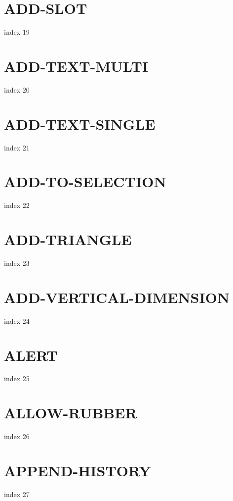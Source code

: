 \documentclass[10pt]{report}
\begin{document}
\section{ADD-SLOT}

index 19

\section{ADD-TEXT-MULTI}

index 20

\section{ADD-TEXT-SINGLE}

index 21

\section{ADD-TO-SELECTION}

index 22

\section{ADD-TRIANGLE}

index 23

\section{ADD-VERTICAL-DIMENSION}

index 24

\section{ALERT}

index 25

\section{ALLOW-RUBBER}

index 26

\section{APPEND-HISTORY}

index 27
\end{document}
